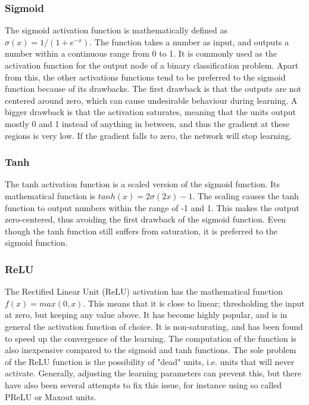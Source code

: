 \subsubsection{Sigmoid}

The sigmoid activation function is mathematically defined as $\sigma(x) = 1/(1 + e^{-x})$. The function takes a number as input, and outputs a number within a continuous range from 0 to 1. It is commonly used as the activation function for the output node of a binary classification problem. Apart from this, the other activations functions tend to be preferred to the sigmoid function because of its drawbacks. The first drawback is that the outputs are not centered around zero, which can cause undesirable behaviour during learning. A bigger drawback is that the activation saturates, meaning that the units output mostly 0 and 1 instead of anything in between, and thus the gradient at these regions is very low. If the gradient falls to zero, the network will stop learning.

\subsubsection{Tanh}

The tanh activation function is a scaled version of the sigmoid function. Its mathematical function is $tanh(x) = 2\sigma(2x) - 1$. The scaling causes the tanh function to output numbers within the range of -1 and 1. This makes the output zero-centered, thus avoiding the first drawback of the sigmoid function. Even though the tanh function still suffers from saturation, it is preferred to the sigmoid function.

\subsubsection{ReLU}

The Rectified Linear Unit (ReLU) activation has the mathematical function $f(x) = max(0,x)$. This means that it is close to linear; thresholding the input at zero, but keeping any value above. It has become highly popular, and is in general the activation function of choice. It is non-saturating, and has been found to speed up the convergence of the learning. The computation of the function is also inexpensive compared to the sigmoid and tanh functions. The sole problem of the ReLU function is the possibility of "dead" units, i.e. units that will never activate. Generally, adjusting the learning parameters can prevent this, but there have also been several attempts to fix this issue, for instance using so called PReLU or Maxout units.

